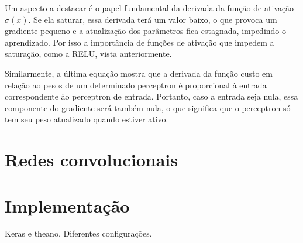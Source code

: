 Um aspecto a destacar é o papel fundamental da derivada da função de ativação $\sigma(x)$. Se ela saturar, essa derivada terá um valor baixo, o que provoca um gradiente pequeno e a atualização dos parâmetros fica estagnada, impedindo o aprendizado. Por isso a importância de funções de ativação que impedem a saturação, como a RELU, vista anteriormente.

Similarmente, a última equação mostra que a derivada da função custo em relação ao pesos de um determinado perceptron é proporcional à entrada correspondente ào perceptron de entrada. Portanto, caso a entrada seja nula, essa componente do gradiente será também nula, o que significa que o perceptron só tem seu peso atualizado quando estiver ativo.

\section{Redes convolucionais}
\section{Implementação}
Keras e theano. Diferentes configurações.

